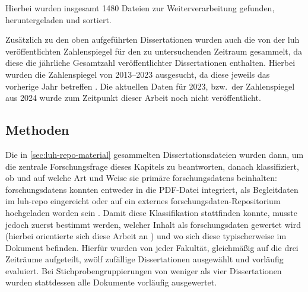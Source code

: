 \noindent Hierbei wurden insgesamt \num{1480} Dateien zur Weiterverarbeitung gefunden, heruntergeladen und sortiert.

Zusätzlich zu den oben aufgeführten Dissertationen wurden auch die von der \gls{luh} veröffentlichten Zahlenspiegel für den zu untersuchenden Zeitraum gesammelt, da diese die jährliche Gesamtzahl veröffentlichter Dissertationen enthalten.
Hierbei wurden die Zahlenspiegel von 2013--2023 ausgesucht, da diese jeweils das vorherige Jahr betreffen \autocite{Zahlenspiegel2013,Zahlenspiegel2014,Zahlenspiegel2015,Zahlenspiegel2016,Zahlenspiegel2017,Zahlenspiegel2018,Zahlenspiegel2019,Zahlenspiegel2020,Zahlenspiegel2021,Zahlenspiegel2022,Zahlenspiegel2023}.
Die aktuellen Daten für 2023, bzw.~der Zahlenspiegel aus 2024 wurde zum Zeitpunkt dieser Arbeit noch nicht veröffentlicht.

\subsection{Methoden}\label{sec:luh-repo-methods}
Die in \cref{sec:luh-repo-material} gesammelten Dissertationsdateien wurden dann, um die zentrale Forschungsfrage dieses Kapitels zu beantworten, danach klassifiziert, ob und auf welche Art und Weise sie primäre \glspl{forschungsdaten} beinhalten:
\glspl{forschungsdaten} konnten entweder in die PDF-Datei integriert, als Begleitdaten im \gls{luh-repo} eingereicht oder auf ein externes \gls{forschungsdaten}-Repositorium hochgeladen worden sein \autocite{ReillyEtAl2011}.
Damit diese Klassifikation stattfinden konnte, musste jedoch zuerst bestimmt werden, welcher Inhalt als \gls{forschungsdaten} gewertet wird (hierbei orientierte sich diese Arbeit an \autocite{dfg-richtlinie,Simukovic2014InterviewFD}) und wo sich diese typischerweise im Dokument befinden.
Hierfür wurden von jeder Fakultät, gleichmäßig auf die drei Zeiträume aufgeteilt, zwölf zufällige Dissertationen ausgewählt und vorläufig evaluiert.
Bei Stichprobengruppierungen von weniger als vier Dissertationen wurden stattdessen alle Dokumente vorläufig ausgewertet.

